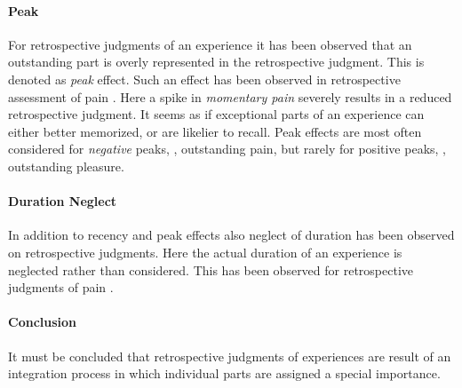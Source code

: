 \paragraph*{Peak}
For retrospective judgments of an experience it has been observed that an outstanding part is overly represented in the retrospective judgment.
This is denoted as \emph{peak} effect.
Such an effect has been observed in retrospective assessment of pain \citep[\cf,][]{kahneman_when_1993, redelmeier_patients_1996}.
Here a spike in \emph{momentary pain} severely results in a reduced retrospective judgment.
It seems as if exceptional parts of an experience can either better memorized, or are likelier to recall.
Peak effects are most often considered for \emph{negative} peaks, \eg, outstanding pain, but rarely for positive peaks, \eg, outstanding pleasure.

\paragraph*{Duration Neglect}
In addition to recency and peak effects also neglect of duration has been observed on retrospective judgments.
Here the actual duration of an experience is neglected rather than considered.
This has been observed for retrospective judgments of pain \citep[\cf,][]{fredrickson_duration_1993, ariely_combining_1998}.

\paragraph*{Conclusion}
It must be concluded that retrospective judgments of experiences are result of an integration process in which individual parts are assigned a special importance.
